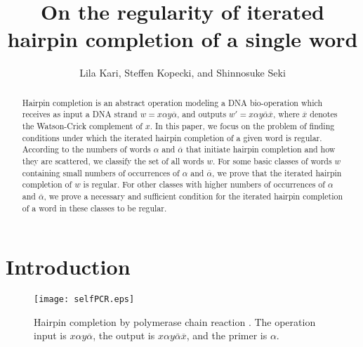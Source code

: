 \documentclass{article}
\title{On the regularity of iterated hairpin completion of a single word}
\author{Lila Kari, Steffen Kopecki, and Shinnosuke Seki}
\theoremstyle{plain}
\theoremstyle{remark}
\newcommand{\calpha}{\ensuremath{\overline{\alpha}}}
\begin{document}
\maketitle

\begin{abstract}
	Hairpin completion is an abstract operation modeling a DNA bio-operation which receives as input a DNA strand $w = x\alpha y \calpha$, and outputs $w' = x \alpha y \bar{\alpha} \overline{x}$, where $\overline{x}$ denotes the Watson-Crick complement of $x$. 
	In this paper, we focus on the problem of finding conditions under which the iterated hairpin completion of a given word is regular. 
	According to the numbers of words $\alpha$ and $\calpha$ that initiate hairpin completion and how they are scattered, we classify the set of all words $w$. 
	For some basic classes of words $w$ containing small numbers of occurrences of $\alpha$ and $\calpha$, we prove that the iterated hairpin completion of $w$ is regular. 
	For other classes with higher numbers of occurrences of $\alpha$ and $\calpha$, we prove a necessary and sufficient condition for the iterated hairpin completion of a word in these classes to be regular. 
\end{abstract}

\section{Introduction}

\begin{figure}
\begin{center}
\texttt{[image: selfPCR.eps]}
\caption{
	Hairpin completion by polymerase chain reaction \cite{HAKSY00, SKKGYISH99}. 
	The operation input is $x\alpha y \calpha$, the output is $x\alpha y \bar{\alpha} \overline{x}$, and the primer is $\alpha$. 
}
\label{fig:selfPCR}
\end{center}
\end{figure}
\end{document}
